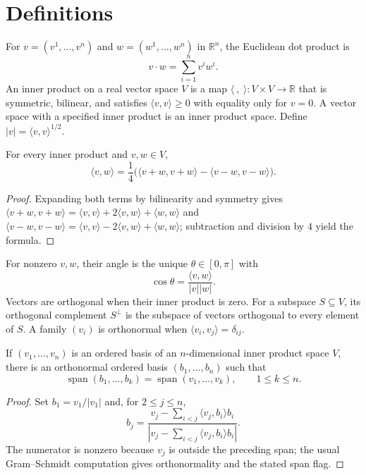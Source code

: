 \section{Definitions}

For $v=(v^1,\ldots,v^n)$ and $w=(w^1,\ldots,w^n)$ in $\mathbb R^n$, the Euclidean dot product is
\[
v\mathbin\cdot w=\sum_{i=1}^n v^i w^i.
\]
An inner product on a real vector space $V$ is a map $\langle\ ,\ \rangle:V\times V\to\mathbb R$ that is symmetric, bilinear, and satisfies $\langle v,v\rangle\ge0$ with equality only for $v=0$. A vector space with a specified inner product is an inner product space. Define $|v|=\langle v,v\rangle^{1/2}$.

\begin{lemma}
\label{lem:polarization-identity}




For every inner product and $v,w\in V$,
\[
\langle v,w\rangle=\frac14\bigl(\langle v+w,v+w\rangle-\langle v-w,v-w\rangle\bigr).
\]
\end{lemma}
\begin{proof}

\sketch Expanding both terms by bilinearity and symmetry gives $\langle v+w,v+w\rangle=\langle v,v\rangle+2\langle v,w\rangle+\langle w,w\rangle$ and $\langle v-w,v-w\rangle=\langle v,v\rangle-2\langle v,w\rangle+\langle w,w\rangle$; subtraction and division by $4$ yield the formula.
\end{proof}

For nonzero $v,w$, their angle is the unique $\theta\in[0,\pi]$ with
\[
\cos\theta=\frac{\langle v,w\rangle}{|v||w|}.
\]
Vectors are orthogonal when their inner product is zero. For a subspace $S\subseteq V$, its orthogonal complement $S^\perp$ is the subspace of vectors orthogonal to every element of $S$. A family $(v_i)$ is orthonormal when $\langle v_i,v_j\rangle=\delta_{ij}$.

\begin{proposition}
\label{prop:gram-schmidt}




If $(v_1,\ldots,v_n)$ is an ordered basis of an $n$-dimensional inner product space $V$, there is an orthonormal ordered basis $(b_1,\ldots,b_n)$ such that
\[
\operatorname{span}(b_1,\ldots,b_k)=\operatorname{span}(v_1,\ldots,v_k),\qquad 1\le k\le n.
\]
\end{proposition}
\begin{proof}

\sketch Set $b_1=v_1/|v_1|$ and, for $2\le j\le n$,
\[
b_j=\frac{v_j-\sum_{i<j}\langle v_j,b_i\rangle b_i}{\left|v_j-\sum_{i<j}\langle v_j,b_i\rangle b_i\right|}.
\]
The numerator is nonzero because $v_j$ is outside the preceding span; the usual Gram--Schmidt computation gives orthonormality and the stated span flag.
\end{proof}

